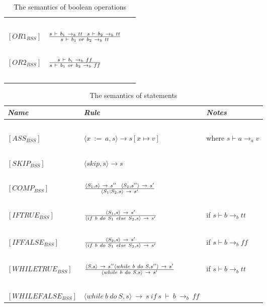 \begin{table}[h]
\begin{tabular}{|l|l|l|}
			~			&															~																			& ~ \\
	$[OR1_{BSS}]$		& $s~\vdash~b_{1}~\rightarrow_{b}~tt~~s~\vdash~b_{2}~
	\rightarrow_{b}~tt \over s~\vdash~b_{1}~or~b_{2}~\rightarrow_{b}~tt$				& ~ \\
			~			&															~																			& ~ \\
	$[OR2_{BSS}]$		& $s~\vdash~b_{i}~\rightarrow_{b}~ff \over s~\vdash~b_{1}~or~b_{2}~\rightarrow_{b}~ff$													& ~ \\
			~			&															~																			& ~ \\
	\hline
	\end{tabular}
	\label{tab:semantics_boolean}
	\caption{The semantics of boolean operations}
\end{table}

\begin{table}[h]
	\begin{tabular}{|l|l|l|}
	\hline
	\emph{Name}			& \emph{Rule}																															& \emph{Notes} \\ \hline
			~			&															~																			& ~ \\
	$[ASS_{BSS}]$		& $\langle x~:=~a,s \rangle \rightarrow s[x \mapsto v]$																					& where $s \vdash a \rightarrow_{a} v$ \\
			~			&															~																			& ~ \\
	$[SKIP_{BSS}]$		& $\langle skip, s \rangle \rightarrow s$																								& ~ \\
			~			&															~																			& ~ \\
	$[COMP_{BSS}]$		& $\langle S_{1},s \rangle~\rightarrow~s''~~\langle S_{1},s'' \rangle~\rightarrow~s'  \over \langle S_{1};S_{2},s \rangle~\rightarrow~s'$	& ~ \\
			~			&															~																			& ~ \\
	$[IFTRUE_{BSS}]$	& $\langle S_{1},s \rangle~\rightarrow~s' \over \langle if~b~do~S_{1}~else~S_{2},s \rangle~\rightarrow~s'	$							& if $s \vdash b \rightarrow_{b} tt$\\
			~			&															~																			& ~ \\
	$[IFFALSE_{BSS}]$	& $\langle S_{2},s \rangle~\rightarrow~s' \over \langle if~b~do~S_{1}~else~S_{2},s \rangle~\rightarrow~s'	$							& if $s \vdash b \rightarrow_{b} ff$\\
			~			&															~																			& ~ \\
	$[WHILETRUE_{BSS}]$	& $\langle S,s \rangle~\rightarrow~s'' \langle while~b~do~S,s'' \rangle~\rightarrow~s' \over \langle while~b~do~S,s \rangle~\rightarrow~s'	$ & if $s \vdash b \rightarrow_{b} tt$\\
			~			&															~																			& ~ \\
	$[WHILEFALSE_{BSS}]$& $\langle while~b~do~S,s \rangle~\rightarrow~s~if~s~\vdash~b~\rightarrow_{b}~ff $														& ~ \\
	\hline
	\end{tabular}
	\label{tab:semantics_statements}
	\caption{The semantics of statements}
\end{table}